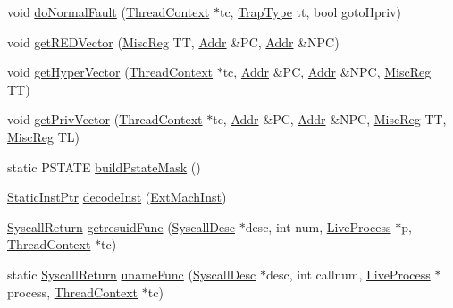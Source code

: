 \begin{DoxyCompactItemize}
\item 
void \hyperlink{namespaceSparcISA_ac81fd7b66ea3afdf9597646f8732c2ff}{doNormalFault} (\hyperlink{classThreadContext}{ThreadContext} $\ast$tc, \hyperlink{namespaceSparcISA_aabeb6cc11127ef5b6ebc776bfc5fb95b}{TrapType} tt, bool gotoHpriv)
\item 
void \hyperlink{namespaceSparcISA_a49dee5cc438e190bcdb1756438219536}{getREDVector} (\hyperlink{namespaceSparcISA_aa16539aa6584fd12f7d6fa868f75b4de}{MiscReg} TT, \hyperlink{base_2types_8hh_af1bb03d6a4ee096394a6749f0a169232}{Addr} \&PC, \hyperlink{base_2types_8hh_af1bb03d6a4ee096394a6749f0a169232}{Addr} \&NPC)
\item 
void \hyperlink{namespaceSparcISA_a56dcbc48848c13640127fdef50b12bf7}{getHyperVector} (\hyperlink{classThreadContext}{ThreadContext} $\ast$tc, \hyperlink{base_2types_8hh_af1bb03d6a4ee096394a6749f0a169232}{Addr} \&PC, \hyperlink{base_2types_8hh_af1bb03d6a4ee096394a6749f0a169232}{Addr} \&NPC, \hyperlink{namespaceSparcISA_aa16539aa6584fd12f7d6fa868f75b4de}{MiscReg} TT)
\item 
void \hyperlink{namespaceSparcISA_a2fa7898cfa4407a5ae9e3ae734d6378b}{getPrivVector} (\hyperlink{classThreadContext}{ThreadContext} $\ast$tc, \hyperlink{base_2types_8hh_af1bb03d6a4ee096394a6749f0a169232}{Addr} \&PC, \hyperlink{base_2types_8hh_af1bb03d6a4ee096394a6749f0a169232}{Addr} \&NPC, \hyperlink{namespaceSparcISA_aa16539aa6584fd12f7d6fa868f75b4de}{MiscReg} TT, \hyperlink{namespaceSparcISA_aa16539aa6584fd12f7d6fa868f75b4de}{MiscReg} TL)
\item 
static PSTATE \hyperlink{namespaceSparcISA_a0170de35fad2e40ebe06650f8b074bdc}{buildPstateMask} ()
\item 
\hyperlink{classRefCountingPtr}{StaticInstPtr} \hyperlink{namespaceSparcISA_aaf291bfb6ea39d0d8b0c369307f2eb92}{decodeInst} (\hyperlink{namespaceSparcISA_aec686c38e40c7f794f1435591c15c275}{ExtMachInst})
\item 
\hyperlink{classSyscallReturn}{SyscallReturn} \hyperlink{namespaceSparcISA_a313b9d62bcf3a577491d7411bf69088b}{getresuidFunc} (\hyperlink{classSyscallDesc}{SyscallDesc} $\ast$desc, int num, \hyperlink{classLiveProcess}{LiveProcess} $\ast$p, \hyperlink{classThreadContext}{ThreadContext} $\ast$tc)
\item 
static \hyperlink{classSyscallReturn}{SyscallReturn} \hyperlink{namespaceSparcISA_ad0d0a68cadef3306ab1b1eba0af16e7c}{unameFunc} (\hyperlink{classSyscallDesc}{SyscallDesc} $\ast$desc, int callnum, \hyperlink{classLiveProcess}{LiveProcess} $\ast$process, \hyperlink{classThreadContext}{ThreadContext} $\ast$tc)

\end{DoxyCompactItemize}
